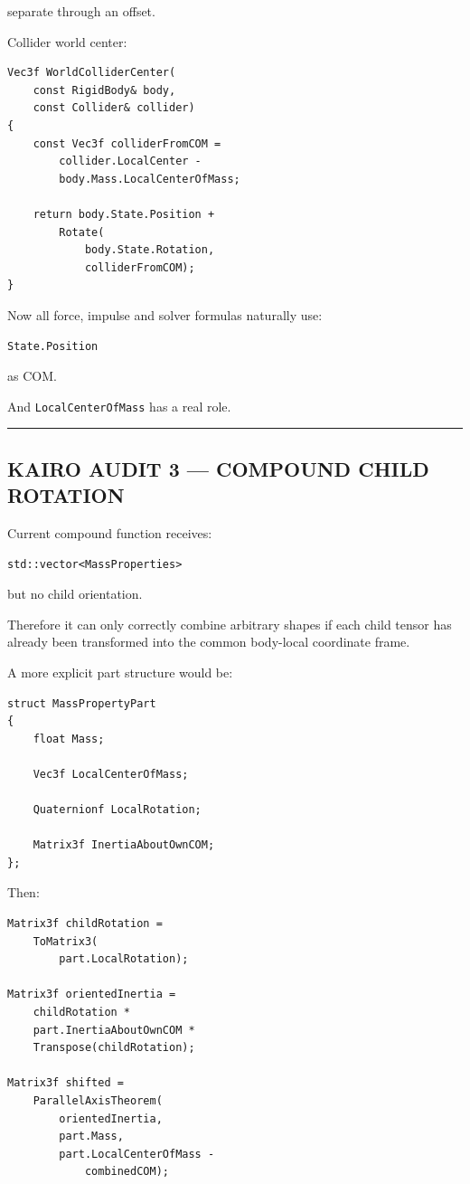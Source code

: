 separate through an offset.

Collider world center:

\begin{verbatim}
Vec3f WorldColliderCenter(
    const RigidBody& body,
    const Collider& collider)
{
    const Vec3f colliderFromCOM =
        collider.LocalCenter -
        body.Mass.LocalCenterOfMass;

    return body.State.Position +
        Rotate(
            body.State.Rotation,
            colliderFromCOM);
}
\end{verbatim}

Now all force, impulse and solver formulas naturally use:

\begin{verbatim}
State.Position
\end{verbatim}

as COM.

And \texttt{LocalCenterOfMass} has a real role.

\begin{center}\rule{0.5\linewidth}{0.5pt}\end{center}

\subsection{KAIRO AUDIT 3 --- COMPOUND CHILD ROTATION}\label{06-engine-ii-ch035-kairo-audit-3-compound-child-rotation}

Current compound function receives:

\begin{verbatim}
std::vector<MassProperties>
\end{verbatim}

but no child orientation.

Therefore it can only correctly combine arbitrary shapes if each child tensor has already been transformed into the common body-local coordinate frame.

A more explicit part structure would be:

\begin{verbatim}
struct MassPropertyPart
{
    float Mass;

    Vec3f LocalCenterOfMass;

    Quaternionf LocalRotation;

    Matrix3f InertiaAboutOwnCOM;
};
\end{verbatim}

Then:

\begin{verbatim}
Matrix3f childRotation =
    ToMatrix3(
        part.LocalRotation);

Matrix3f orientedInertia =
    childRotation *
    part.InertiaAboutOwnCOM *
    Transpose(childRotation);

Matrix3f shifted =
    ParallelAxisTheorem(
        orientedInertia,
        part.Mass,
        part.LocalCenterOfMass -
            combinedCOM);
\end{verbatim}

